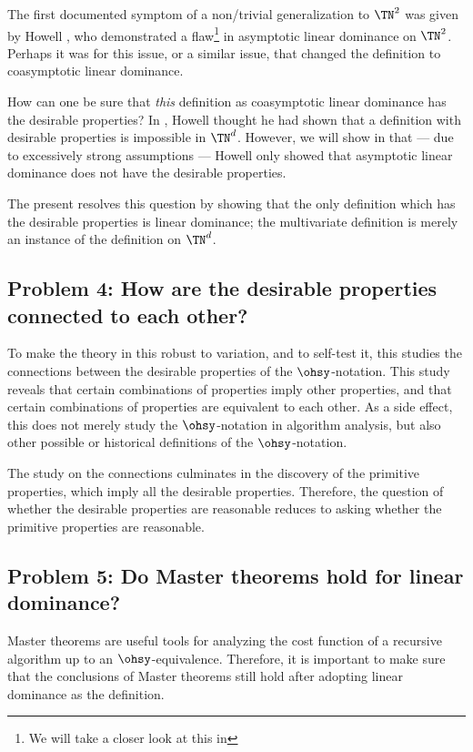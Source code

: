 \documentclass[b5paper, english, oneside]{memoir}
\begin{document}
The first documented symptom of a non\-/trivial generalization to $\TN^2$ was given by Howell \cite{OhImpossible}, who demonstrated a flaw\footnote{We will take a closer look at this in } in asymptotic linear dominance on $\TN^2$. Perhaps it was for this issue, or a similar issue, that \cite{IntroAlgo2009} changed the definition to coasymptotic linear dominance. 

How can one be sure that \emph{this} definition as coasymptotic linear dominance has the desirable properties? In \cite{OhImpossible}, Howell thought he had shown that a definition with desirable properties is impossible in $\TN^d$. However, we will show in  that --- due to excessively strong assumptions --- Howell only showed that asymptotic linear dominance does not have the desirable properties. 

The present \manuscript{} resolves this question by showing that the only definition which has the desirable properties is linear dominance; the multivariate definition is merely an instance of the definition on $\TN^d$. 

\subsection{Problem 4: How are the desirable properties connected to each other?}

To make the theory in this \manuscript{} robust to variation, and to self-test it, this \manuscript{} studies the connections between the desirable properties of the $\ohsy$-notation. This study reveals that certain combinations of properties imply other properties, and that certain combinations of properties are equivalent to each other. As a side effect, this \manuscript{} does not merely study the $\ohsy$-notation in algorithm analysis, but also other possible or historical definitions of the $\ohsy$-notation. 

The study on the connections culminates in the discovery of the \nprim{} primitive properties, which imply all the desirable properties. Therefore, the question of whether the desirable properties are reasonable reduces to asking whether the primitive properties are reasonable.

\subsection{Problem 5: Do Master theorems hold for linear dominance?}

Master theorems are useful tools for analyzing the cost function of a recursive algorithm up to an $\ohsy$-equivalence. Therefore, it is important to make sure that the conclusions of Master theorems still hold after adopting linear dominance as the definition. 
\end{document}
